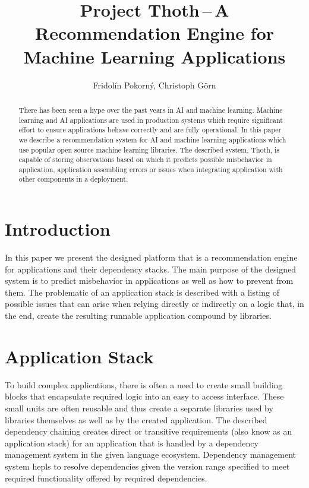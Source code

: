 \documentclass[a4paper]{llncs}
\begin{document}
%
\title{Project Thoth\,--\,A Recommendation Engine for Machine Learning Applications}
%
%
\author{Fridol\'in Pokorn\'y, Christoph G\"orn}


\maketitle
\begin{abstract}
There has been seen a hype over the past years in AI and machine learning. Machine learning and AI applications are used in production systems which require significant effort to ensure applications behave correctly and are fully operational. In this paper we describe a recommendation system for AI and machine learning applications which use popular open source machine learning libraries. The described system, Thoth, is capable of storing observations based on which it predicts possible misbehavior in application, application assembling errors or issues when integrating application with other components in a deployment.
\end{abstract}

\section{Introduction}

In this paper we present the designed platform that is a recommendation engine for applications and their dependency stacks. The main purpose of the designed system is to predict misbehavior in applications as well as how to prevent from them. The problematic of an application stack is described with a listing of possible issues that can arise when relying directly or indirectly on a logic that, in the end, create the resulting runnable application compound by libraries.

\section{Application Stack}

To build complex applications, there is often a need to create small building blocks that encapsulate required logic into an easy to access interface. These small units are often reusable and thus create a separate libraries used by libraries themselves as well as by the created application. The described dependency chaining creates direct or transitive requirements (also know as an application stack) for an application that is handled by a dependency management system in the given language ecosystem. Dependency management system hepls to resolve dependencies given the version range specified to meet required functionality offered by required dependencies.
\end{document}
